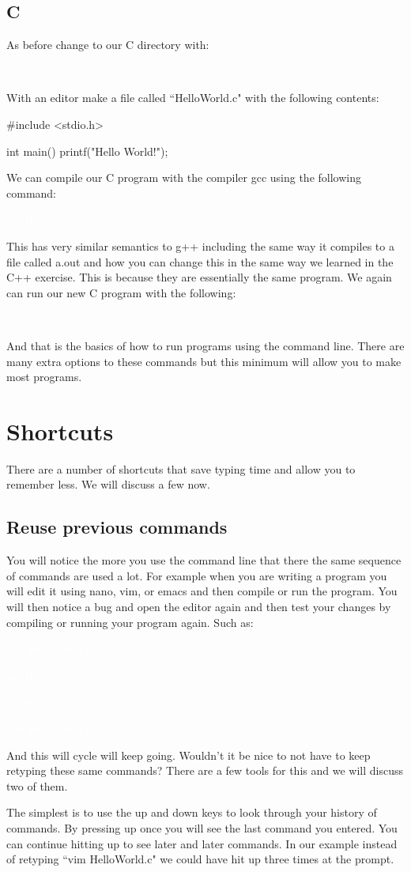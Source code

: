\documentclass[oneside]{book}
\newcommand{\commandline}[1]{\begin{center} \colorbox{Dark}{\textcolor{white}{#1}} \end{center}}
\begin{document}
\subsection{C}
As before change to our C directory with:
\commandline{cd ../C}
With an editor make a file called ``HelloWorld.c" with the following contents:
\begin{verbatimtab}
    #include <stdio.h>
    
    int main() {
        printf("Hello World!\n");
    }
\end{verbatimtab}
We can compile our C program with the compiler gcc using the following command:
\commandline{gcc HelloWorld.c}
This has very similar semantics to g++ including the same way it compiles to a file called a.out and how you can change this in the same way we learned in the C++ exercise. This is because they are essentially the same program. We again can run our new C program with the following:
\commandline{./a.out}
And that is the basics of how to run programs using the command line. There are many extra options to these commands but this minimum will allow you to make most programs.

\newpage
\section{Shortcuts}
There are a number of shortcuts that save typing time and allow you to remember less. We will discuss a few now.
\subsection{Reuse previous commands}
You will notice the more you use the command line that there the same sequence of commands are used a lot. For example when you are writing a program you will edit it using nano, vim, or emacs and then compile or run the program. You will then notice a bug and open the editor again and then test your changes by compiling or running your program again. Such as:
\commandline{vim HelloWorld.c}
\commandline{gcc HelloWorld.c}
\commandline{./a.out}
\commandline{vim HelloWorld.c}
And this will cycle will keep going. Wouldn't it be nice to not have to keep retyping these same commands? There are a few tools for this and we will discuss two of them. 

The simplest is to use the up and down keys to look through your history of commands. By pressing up once you will see the last command you entered. You can continue hitting up to see later and later commands. In our example instead of retyping ``vim HelloWorld.c" we could have hit up three times at the prompt. 
\end{document}
